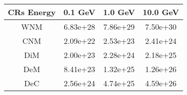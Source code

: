 \begin{tabular}{cccc} 
\hline 
CRs Energy & 0.1 GeV & 1.0 GeV & 10.0 GeV \\ 
\hline 
WNM & 6.83e+28  & 7.86e+29  & 7.50e+30 \\ 
CNM & 2.09e+22  & 2.53e+23  & 2.41e+24 \\ 
DiM & 2.00e+23  & 2.28e+24  & 2.18e+25 \\ 
DeM & 8.41e+23  & 1.32e+25  & 1.26e+26 \\ 
DeC & 2.56e+24  & 4.74e+25  & 4.59e+26 \\ 
\hline 
\end{tabular}